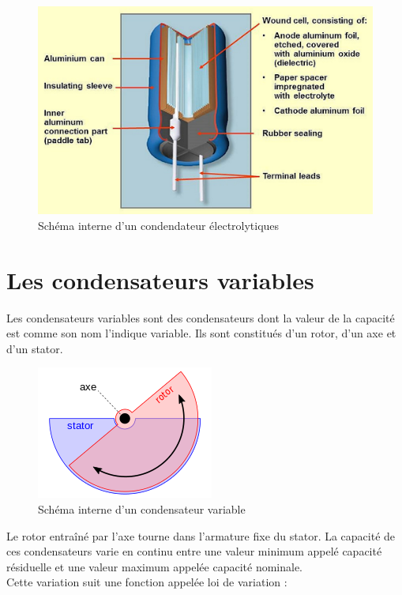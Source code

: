 \begin{figure}[!h]
    \centering
    \includegraphics[scale=0.5]{./picture4/condo_electro.png}
    \caption{Schéma interne d'un condendateur électrolytiques}
\end{figure}


\section{Les condensateurs variables}

Les condensateurs variables sont des condensateurs dont la valeur de la capacité est comme son nom l’indique variable. Ils sont constitués d’un rotor, d’un axe et d’un stator. 

\begin{figure}[!h]
    \centering
    \includegraphics[scale=0.5]{./picture4/condo_variable.png}
    \caption{Schéma interne d'un condensateur variable}
\end{figure}

Le rotor entraîné par l’axe tourne dans l’armature fixe du stator. La capacité de ces condensateurs varie en continu entre une valeur minimum appelé capacité résiduelle et une valeur maximum appelée capacité nominale. \\

Cette variation suit une fonction appelée loi de variation : 

